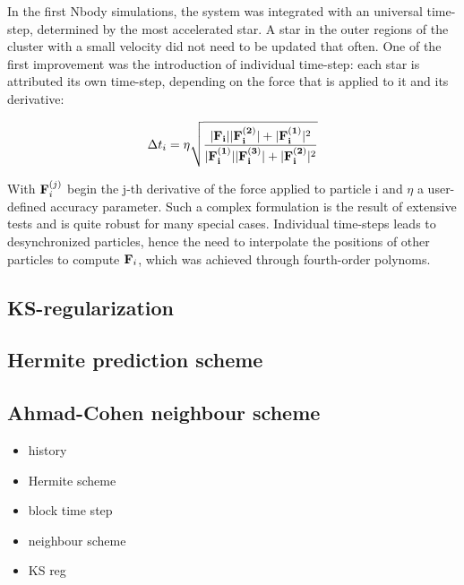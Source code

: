 In the first Nbody simulations, the system was integrated with an universal time-step, determined by the most accelerated star. A star in the outer regions of the cluster with a small velocity did not need to be updated that often. One of the first improvement  was the introduction of individual time-step: each star is attributed its own time-step, depending on the force that is applied to it and its derivative:

\begin{equation}
\Delta t_i =  \eta \sqrt{\frac{ |\bold{F_i}||\bold{F^{(2)}_i}| + |\bold{F^{(1)}_i}|^2 }{|\bold{F^{(1)}_i}||\bold{F^{(3)}_i}| + |\bold{F^{(2)}_i}|^2}}
\end{equation}
 
With $\bold{F}^{(j)}_i$ begin the j-th derivative of the force applied to particle i and $\eta$ a user-defined accuracy parameter. Such a complex formulation is the result of extensive tests and is quite robust for many special cases. Individual time-steps leads to desynchronized particles, hence the need to interpolate the positions of other particles to compute $\bold{F}_i$, which was achieved through fourth-order polynoms.
 
 
 
 
\subsection{KS-regularization}

\subsection{Hermite prediction scheme}

\subsection{Ahmad-Cohen neighbour scheme}

\begin{itemize}
\item history
\item Hermite scheme
\item block time step
\item neighbour scheme
\item KS reg
\end{itemize}













